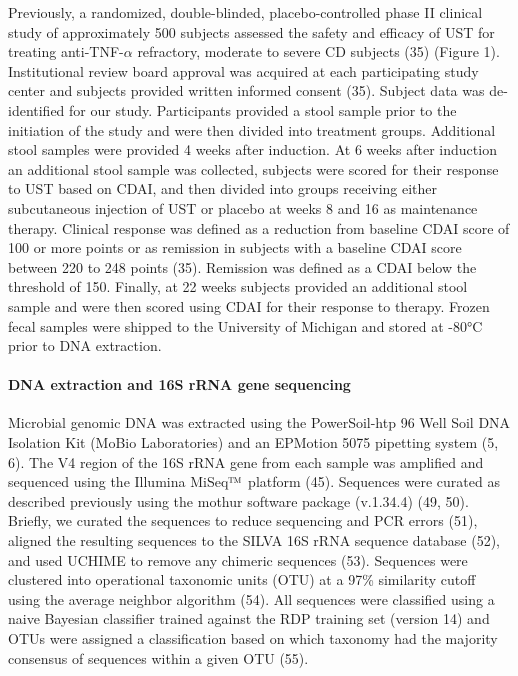 \documentclass[12pt,]{article}
\let\oldparagraph\paragraph
\renewcommand{\paragraph}[1]{\oldparagraph{#1}\mbox{}}
\begin{document}
Previously, a randomized, double-blinded, placebo-controlled phase II
clinical study of approximately 500 subjects assessed the safety and
efficacy of UST for treating anti-TNF-\({\alpha}\) refractory, moderate
to severe CD subjects (35) (Figure 1). Institutional review board
approval was acquired at each participating study center and subjects
provided written informed consent (35). Subject data was de-identified
for our study. Participants provided a stool sample prior to the
initiation of the study and were then divided into treatment groups.
Additional stool samples were provided 4 weeks after induction. At 6
weeks after induction an additional stool sample was collected, subjects
were scored for their response to UST based on CDAI, and then divided
into groups receiving either subcutaneous injection of UST or placebo at
weeks 8 and 16 as maintenance therapy. Clinical response was defined as
a reduction from baseline CDAI score of 100 or more points or as
remission in subjects with a baseline CDAI score between 220 to 248
points (35). Remission was defined as a CDAI below the threshold of 150.
Finally, at 22 weeks subjects provided an additional stool sample and
were then scored using CDAI for their response to therapy. Frozen fecal
samples were shipped to the University of Michigan and stored at -80°C
prior to DNA extraction.

\paragraph{DNA extraction and 16S rRNA gene
sequencing}\label{dna-extraction-and-16s-rrna-gene-sequencing}

Microbial genomic DNA was extracted using the PowerSoil-htp 96 Well Soil
DNA Isolation Kit (MoBio Laboratories) and an EPMotion 5075 pipetting
system (5, 6). The V4 region of the 16S rRNA gene from each sample was
amplified and sequenced using the Illumina
MiSeq\(\text{\texttrademark}\) platform (45). Sequences were curated as
described previously using the mothur software package (v.1.34.4) (49,
50). Briefly, we curated the sequences to reduce sequencing and PCR
errors (51), aligned the resulting sequences to the SILVA 16S rRNA
sequence database (52), and used UCHIME to remove any chimeric sequences
(53). Sequences were clustered into operational taxonomic units (OTU) at
a 97\% similarity cutoff using the average neighbor algorithm (54). All
sequences were classified using a naive Bayesian classifier trained
against the RDP training set (version 14) and OTUs were assigned a
classification based on which taxonomy had the majority consensus of
sequences within a given OTU (55).
\end{document}
